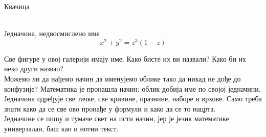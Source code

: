 \documentclass[sr]{./../../common/SurferDesc}%
\begin{document}
\footnotesize

 

\begin{surferPage}
  \begin{surferTitle}Квачица\end{surferTitle}  \\
Једначина, недвосмислено име \\
\smallskip
\[x^2 + y^2	= z^3	(1 - z) \]


\singlespacing
Све фигуре у овој галерији имају име. Како бисте их ви назвали? Како би их неко други назвао?\\
\vspace{0.3cm}
Можемо ли да нађемо начин да именујемо облике тако да никад не дође до конфузије? Математика је пронашла начин: облик добија име по својој једначини. Једначина одређује све тачке, све кривине, празнине, наборе и врхове. Само треба знати како да се све ово пронађе у формули и како да се то нацрта.\\
\vspace{0.3cm}
Једначине се пишу и тумаче свет на исти начин, јер је језик математике универзалан, баш као и нотни текст. 

  \begin{surferText}
     \end{surferText}
\end{surferPage}
\end{document}
